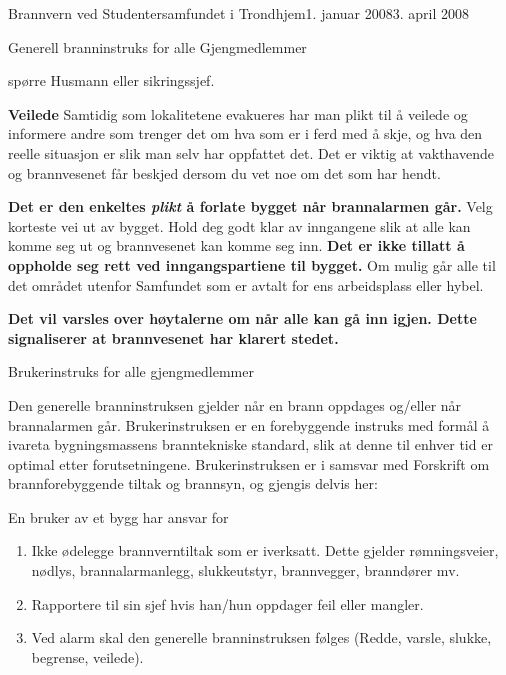 \begin{instruks}{Brannvern ved Studentersamfundet i Trondhjem}{1. januar 2008}{3. april 2008}
\begin{instruksledd}{Generell branninstruks for alle Gjengmedlemmer}
\begin{description}
            spørre Husmann eller sikringssjef.
        \item \textbf{Veilede} Samtidig som lokalitetene evakueres har man plikt til å veilede og
                    informere andre som trenger det om hva som er i
                    ferd med å skje, og hva den reelle situasjon er slik man selv har
                    oppfattet det. Det er viktig at vakthavende og
                    brannvesenet får beskjed dersom du vet noe om det som har hendt.
    \end{description}
            
    \textbf{Det er den enkeltes \emph{plikt} å forlate bygget når brannalarmen går.} Velg korteste vei
       ut av bygget. Hold deg godt klar av inngangene slik at alle kan komme seg ut og brannvesenet kan komme seg inn.
       \textbf{Det er ikke tillatt å oppholde seg rett ved inngangspartiene til bygget.} Om mulig går alle til det området utenfor
       Samfundet som er avtalt for ens arbeidsplass eller hybel.

       \textbf{Det vil varsles over høytalerne om når alle kan gå inn igjen. Dette signaliserer at
       brannvesenet har klarert stedet.}

   
    \end{instruksledd}



    \begin{instruksledd}{Brukerinstruks for alle gjengmedlemmer}

        
        Den generelle branninstruksen gjelder når en brann oppdages og/eller når
        brannalarmen går. Brukerinstruksen er en
        forebyggende instruks med formål å ivareta bygningsmassens branntekniske standard,
        slik at denne til enhver tid er
        optimal etter forutsetningene. Brukerinstruksen er i samsvar med Forskrift om
        brannforebyggende tiltak og brannsyn,
        og gjengis delvis her:
 
        \begin{instruksledd}{En bruker av et bygg har ansvar for}
            \begin{enumerate}
                \item Ikke ødelegge brannverntiltak som er iverksatt. Dette gjelder rømningsveier, nødlys, brannalarmanlegg,
                    slukkeutstyr, brannvegger, branndører mv.
                \item Rapportere til sin sjef hvis han/hun oppdager feil eller mangler.
                \item  Ved alarm skal den generelle branninstruksen følges (Redde, varsle,
                    slukke, begrense, veilede).
            \end{enumerate}
        
        \end{instruksledd}

    \end{instruksledd}


   
\end{instruks}
